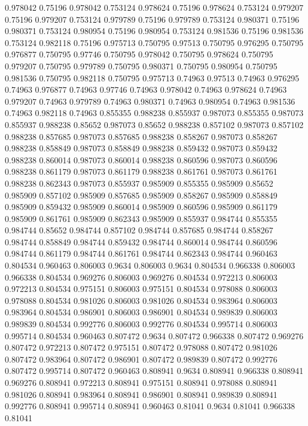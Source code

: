 0.978042 0.75196
0.978042 0.753124
0.978624 0.75196
0.978624 0.753124
0.979207 0.75196
0.979207 0.753124
0.979789 0.75196
0.979789 0.753124
0.980371 0.75196
0.980371 0.753124
0.980954 0.75196
0.980954 0.753124
0.981536 0.75196
0.981536 0.753124
0.982118 0.75196
0.975713 0.750795
0.97513 0.750795
0.976295 0.750795
0.976877 0.750795
0.97746 0.750795
0.978042 0.750795
0.978624 0.750795
0.979207 0.750795
0.979789 0.750795
0.980371 0.750795
0.980954 0.750795
0.981536 0.750795
0.982118 0.750795
0.975713 0.74963
0.97513 0.74963
0.976295 0.74963
0.976877 0.74963
0.97746 0.74963
0.978042 0.74963
0.978624 0.74963
0.979207 0.74963
0.979789 0.74963
0.980371 0.74963
0.980954 0.74963
0.981536 0.74963
0.982118 0.74963
0.855355 0.988238
0.855937 0.987073
0.855355 0.987073
0.855937 0.988238
0.85652 0.987073
0.85652 0.988238
0.857102 0.987073
0.857102 0.988238
0.857685 0.987073
0.857685 0.988238
0.858267 0.987073
0.858267 0.988238
0.858849 0.987073
0.858849 0.988238
0.859432 0.987073
0.859432 0.988238
0.860014 0.987073
0.860014 0.988238
0.860596 0.987073
0.860596 0.988238
0.861179 0.987073
0.861179 0.988238
0.861761 0.987073
0.861761 0.988238
0.862343 0.987073
0.855937 0.985909
0.855355 0.985909
0.85652 0.985909
0.857102 0.985909
0.857685 0.985909
0.858267 0.985909
0.858849 0.985909
0.859432 0.985909
0.860014 0.985909
0.860596 0.985909
0.861179 0.985909
0.861761 0.985909
0.862343 0.985909
0.855937 0.984744
0.855355 0.984744
0.85652 0.984744
0.857102 0.984744
0.857685 0.984744
0.858267 0.984744
0.858849 0.984744
0.859432 0.984744
0.860014 0.984744
0.860596 0.984744
0.861179 0.984744
0.861761 0.984744
0.862343 0.984744
0.960463 0.804534
0.960463 0.806003
0.9634 0.806003
0.9634 0.804534
0.966338 0.806003
0.966338 0.804534
0.969276 0.806003
0.969276 0.804534
0.972213 0.806003
0.972213 0.804534
0.975151 0.806003
0.975151 0.804534
0.978088 0.806003
0.978088 0.804534
0.981026 0.806003
0.981026 0.804534
0.983964 0.806003
0.983964 0.804534
0.986901 0.806003
0.986901 0.804534
0.989839 0.806003
0.989839 0.804534
0.992776 0.806003
0.992776 0.804534
0.995714 0.806003
0.995714 0.804534
0.960463 0.807472
0.9634 0.807472
0.966338 0.807472
0.969276 0.807472
0.972213 0.807472
0.975151 0.807472
0.978088 0.807472
0.981026 0.807472
0.983964 0.807472
0.986901 0.807472
0.989839 0.807472
0.992776 0.807472
0.995714 0.807472
0.960463 0.808941
0.9634 0.808941
0.966338 0.808941
0.969276 0.808941
0.972213 0.808941
0.975151 0.808941
0.978088 0.808941
0.981026 0.808941
0.983964 0.808941
0.986901 0.808941
0.989839 0.808941
0.992776 0.808941
0.995714 0.808941
0.960463 0.81041
0.9634 0.81041
0.966338 0.81041
